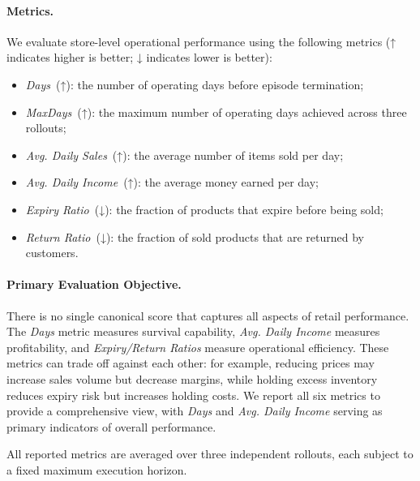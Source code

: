 \paragraph{Metrics.}
We evaluate store-level operational performance using the following metrics (↑ indicates higher is better; ↓ indicates lower is better):
\begin{itemize}[leftmargin=*]
    \item \textit{Days}~(↑): the number of operating days before episode termination;
    \item \textit{MaxDays}~(↑): the maximum number of operating days achieved across three rollouts;
    \item \textit{Avg. Daily Sales}~(↑): the average number of items sold per day;
    \item \textit{Avg. Daily Income}~(↑): the average money earned per day;
    \item \textit{Expiry Ratio}~(↓): the fraction of products that expire before being sold;
    \item \textit{Return Ratio}~(↓): the fraction of sold products that are returned by customers.
\end{itemize}

\paragraph{Primary Evaluation Objective.}
There is no single canonical score that captures all aspects of retail performance. The \textit{Days} metric measures survival capability, \textit{Avg. Daily Income} measures profitability, and \textit{Expiry/Return Ratios} measure operational efficiency. These metrics can trade off against each other: for example, reducing prices may increase sales volume but decrease margins, while holding excess inventory reduces expiry risk but increases holding costs. We report all six metrics to provide a comprehensive view, with \textit{Days} and \textit{Avg. Daily Income} serving as primary indicators of overall performance.

All reported metrics are averaged over three independent rollouts, each subject to a fixed maximum execution horizon.





